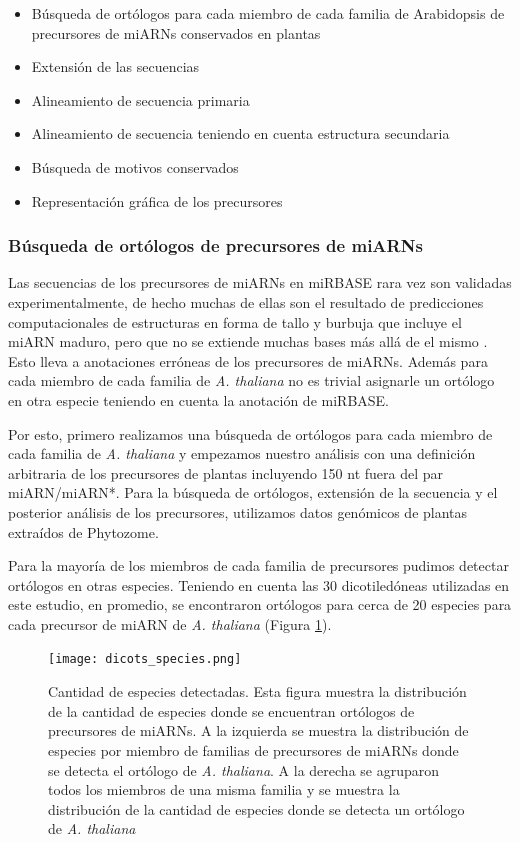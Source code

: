 \begin{itemize}
    \item Búsqueda de ortólogos para cada miembro de cada familia de Arabidopsis de  precursores de miARNs conservados en plantas
    \item Extensión de las secuencias
    \item Alineamiento de secuencia primaria
    \item Alineamiento de secuencia teniendo en cuenta estructura secundaria
    \item Búsqueda de motivos conservados
    \item Representación gráfica de los precursores
\end{itemize}

\subsubsection{Búsqueda de ortólogos de precursores de miARNs}

Las secuencias de los precursores de miARNs en miRBASE rara vez son validadas experimentalmente, de hecho muchas de ellas son el resultado de predicciones computacionales de estructuras en forma de tallo y burbuja que incluye el miARN maduro, pero que no se extiende muchas bases más allá de el mismo \cite{Kozomara2014}.
Esto lleva a anotaciones erróneas de los precursores de miARNs.
Además para cada miembro de cada familia de \textit{A. thaliana} no es trivial asignarle un ortólogo en otra especie teniendo en cuenta la anotación de miRBASE.

Por esto, primero realizamos una búsqueda de ortólogos para cada miembro de cada familia de \textit{A. thaliana} y empezamos nuestro análisis con una definición arbitraria de los precursores de plantas incluyendo 150 nt fuera del par miARN/miARN*.
Para la búsqueda de ortólogos, extensión de la secuencia y el posterior análisis de los precursores, utilizamos datos genómicos de plantas extraídos de Phytozome. 

Para la mayoría de los miembros de cada familia de precursores pudimos detectar ortólogos en otras especies. 
Teniendo en cuenta las 30 dicotiledóneas utilizadas en este estudio, en promedio, se encontraron ortólogos para cerca de 20 especies para cada precursor de miARN de \textit{A. thaliana} (Figura \ref{fig:dicots_species}).

\begin{figure}[htbp!] 
    \centering    
    \texttt{[image: dicots\_species.png]}
    \caption[Especies detectadas]{Cantidad de especies detectadas.
    Esta figura muestra la distribución de la cantidad de especies donde se encuentran ortólogos de precursores de miARNs.
    A la izquierda se muestra la distribución de especies por miembro de familias de precursores de miARNs donde se detecta el ortólogo de \textit{A. thaliana}.
    A la derecha se agruparon todos los miembros de una misma familia y se muestra la distribución de la cantidad de especies donde se detecta un ortólogo de \textit{A. thaliana}}
    \label{fig:dicots_species}
\end{figure}


